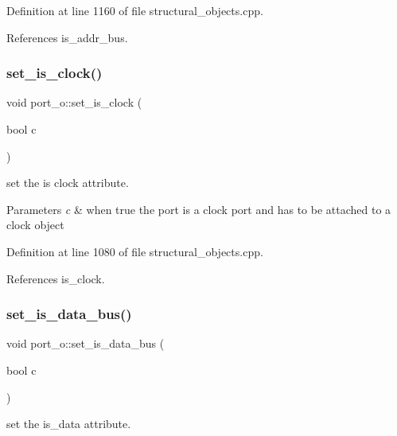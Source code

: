 Definition at line 1160 of file structural\+\_\+objects.\+cpp.



References is\+\_\+addr\+\_\+bus.

\mbox{\label{structport__o_a0023e6ea2769503f76f03a5c0c98c5ca}} 
\subsubsection{\texorpdfstring{set\+\_\+is\+\_\+clock()}{set\_is\_clock()}}
{\footnotesize\ttfamily void port\+\_\+o\+::set\+\_\+is\+\_\+clock (\begin{DoxyParamCaption}\item[{bool}]{c }\end{DoxyParamCaption})}



set the is clock attribute. 


\begin{DoxyParams}{Parameters}
{\em c} & when true the port is a clock port and has to be attached to a clock object \\
\hline
\end{DoxyParams}


Definition at line 1080 of file structural\+\_\+objects.\+cpp.



References is\+\_\+clock.

\mbox{\label{structport__o_adf58a4044d3732e7e1471f313556f477}} 
\subsubsection{\texorpdfstring{set\+\_\+is\+\_\+data\+\_\+bus()}{set\_is\_data\_bus()}}
{\footnotesize\ttfamily void port\+\_\+o\+::set\+\_\+is\+\_\+data\+\_\+bus (\begin{DoxyParamCaption}\item[{bool}]{c }\end{DoxyParamCaption})}



set the is\+\_\+data attribute. 


